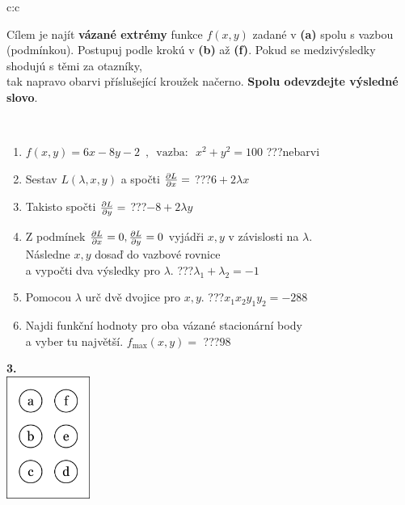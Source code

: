 \documentclass[10pt]{report}
\begin{document}
\begin{tabular}{c:c}
\begin{minipage}[c][104.5mm][t]{0.5\linewidth}
\begin{center}
\begin{minipage}{0.95\linewidth}
\begin{center}
Cílem je najít \textbf{vázané extrémy} funkce $f(x,y)$ zadané v \textbf{(a)} spolu s vazbou (podmínkou). Postupuj podle krokú v \textbf{(b)} až \textbf{(f)}. Pokud se medzivýsledky shodujú s těmi za otazníky,\\tak napravo obarvi příslušející kroužek načerno. \textbf{Spolu odevzdejte výsledné slovo}.
\end{center}
\end{minipage}
\\[1mm]
\begin{minipage}{0.79\linewidth}
\begin{center}
\begin{varwidth}{\linewidth}
\begin{enumerate}
\normalsize
\item $f(x,y)=6x-8y-2 \enspace , \enspace \mathrm{vazba:} \enspace x^2+y^2=100$\quad \dotfill\; ???\;\dotfill \quad nebarvi
\item Sestav $L(\lambda,x,y)$ a spočti $\pdv{L}{x}=$\quad \dotfill\; ???\;\dotfill \quad $6+2\lambda x$
\item Takisto spočti $\pdv{L}{y}=$\quad \dotfill\; ???\;\dotfill \quad $-8+2\lambda y$
\item Z podmínek $\pdv{L}{x}=0 , \pdv{L}{y}=0$ vyjádři $x,y$ v závislosti na $\lambda$.\\ \phantom{xxxxxx}Následne $x,y$ dosaď do vazbové rovnice\\ \phantom{xxxxxx}a vypočti dva výsledky pro $\lambda$.\quad \dotfill\; ???\;\dotfill \quad $\lambda_1+\lambda_2=-1$
\item Pomocou $\lambda$ urč dvě dvojice pro $x,y$.\quad \dotfill\; ???\;\dotfill \quad $x_1 x_2 y_1 y_2=-288$
\item Najdi funkční hodnoty pro oba vázané stacionární body\\ \phantom{xxxxxx}a vyber tu najvětší. $f_{\text{max}}(x,y)=$\quad \dotfill\; ???\;\dotfill \quad $98$
\end{enumerate}
\end{varwidth}
\end{center}
\end{minipage}
\begin{minipage}{0.20\linewidth}
\begin{center}
{\Huge\bfseries 3.} \\[2mm]
\includegraphics[height=40mm]{../images/braille.png}

\end{center}
\end{minipage}
\end{center}
\end{minipage}
\end{tabular}
\end{document}
